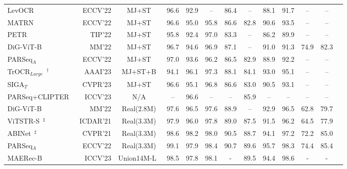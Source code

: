 \documentclass[lettersize,journal]{IEEEtran}
\begin{document}
\begin{table*}[!t]
{\begin{tabular}{l|r|c|cccccccccc}
    LevOCR~\cite{2022_levocr} & ECCV'22 & MJ+ST 
    & 96.6 & 92.9 & -- & 86.4 & -- & 88.1 & 91.7 & -- & -- \\

    MATRN~\cite{2022_matrn} & ECCV'22 & MJ+ST
    & 96.6 & 95.0 & 95.8 & 86.6 & 82.8 & 90.6 & 93.5 & -- & -- \\ 

    PETR~\cite{9865996} & TIP'22 & MJ+ST
    & 95.8 & 92.4 
    & 97.0 & 83.3 & -- & 86.2 & 89.9 & -- & --\\

    DiG-ViT-B~\cite{yang2022reading} & MM'22 & MJ+ST 
    & 96.7 & 94.6 & 96.9 & 87.1 & -- & 91.0 & 91.3 & 74.9 & 82.3 \\

    PARSeq$_A$~\cite{2022_parseq} & ECCV'22 & MJ+ST
    & 97.0 & 93.6 & 96.2 & 86.5 & 82.9 & 88.9 & 92.2 & -- & -- \\

    TrOCR$_{Large}$~\cite{li2021trocr}$^\dagger$ & AAAI'23 & MJ+ST+B
    & 94.1 & 96.1 
    & 97.3 & 88.1 & 84.1 & 93.0 & 95.1 & -- & --\\

    SIGA$_{T}$~\cite{guan2023self} & CVPR'23 & MJ+ST
    & 96.6 & 95.1 & 96.8 & 86.6 & 83.0 & 90.5 & 93.1 & -- & -- \\

    PARSeq+CLIPTER~\cite{abs-2301-07464} & ICCV'23 & N/A
    & -- & 96.6 & -- & -- & 85.9 & -- & -- & -- & -- \\





    DiG-ViT-B~\cite{yang2022reading} & MM'22 & Real(2.8M) 
    & 97.6 & 96.5 & 97.6 & 88.9 & -- & 92.9 & 96.5 & 62.8 & 79.7 \\

    ViTSTR-S~\cite{atienza2021vision}$^\sharp$ & ICDAR'21 & Real(3.3M)
    & 97.9 & 96.0 & 97.8 & 89.0 & 87.5 & 91.5 & 96.2 & 64.5 & 77.9\\

    ABINet~\cite{2021_abinet}$^\sharp$ & CVPR'21 & Real(3.3M)
    & 98.6 & 98.2 & 98.0 & 90.5 & 88.7 & 94.1 & 97.2 & 72.2 & 85.0 \\
    
    PARSeq$_A$~\cite{2022_parseq} & ECCV'22 & Real(3.3M)
    & 99.1 & 97.9 
    & \cellcolor{Gray2}98.4
    & 90.7 & 89.6 & 95.7 & 98.3 & 74.4 & 85.4 \\

    MAERec-B~\cite{jiang2023revisiting} & ICCV'23 & Union14M-L~\cite{jiang2023revisiting}
    & 98.5 & 97.8 
    & 98.1
    & - & 89.5 & 94.4 & 98.6 & - & - \\


\end{tabular}}
\end{table*}
\end{document}
